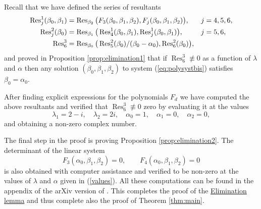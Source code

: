Recall that we have defined the series of resultants
\begin{align*}
 \operatorname{Res}^1_j(\beta_0,\beta_1) &= \operatorname{Res}_{\beta_2}\big(F_3(\beta_0,\beta_1,\beta_2),F_j(\beta_0,\beta_1,\beta_2)\big), & j &= 4,5,6, \\
 \operatorname{Res}^2_j(\beta_0) &= \operatorname{Res}_{\beta_1}\big(\operatorname{Res}^1_4(\beta_0,\beta_1),\operatorname{Res}^1_j(\beta_0,\beta_1)\big), & j &= 5,6, \\
 \operatorname{Res}^3_6   &= \operatorname{Res}_{\beta_0}\big(\operatorname{Res}^2_5(\beta_0)/(\beta_0-\alpha_0),\operatorname{Res}^2_6(\beta_0)\big), & &
\end{align*}
and proved in Proposition \ref{prop:elimination1} that if $\operatorname{Res}_6^3\not\equiv0$ as a function of $\lambda$ and $\alpha$ then any solution $(\beta_0,\beta_1,\beta_2)$ to system (\ref{eq:polysystbis}) satisfies $\beta_0=\alpha_0$. 

After finding explicit expressions for the polynomials $F_d$ we have computed the above resultants and verified that $\operatorname{Res}_6^3\not\equiv0$ zero by evaluating it at the values
\begin{equation}\label{values}
  \lambda_1=2-i,\quad \lambda_2=2i,\quad \alpha_0=1,\quad \alpha_1=0,\quad \alpha_2=0,
\end{equation}
and obtaining a non-zero complex number.

The final step in the proof is proving Proposition \ref{prop:elimination2}. The determinant of the linear system 
\[ F_3(\alpha_0,\beta_1,\beta_2)=0,\qquad F_4(\alpha_0,\beta_1,\beta_2)=0 \] 
is also obtained with computer assistance and verified to be non-zero at the values of $\lambda$ and $\alpha$ given in (\ref{values}). All these computations can be found in the appendix of the arXiv version of \cite{UtmostRigidity}. This completes the proof of the \hyperref[lemma:elimination]{Elimination lemma} and thus complete also the proof of Theorem \ref{thm:main}.




































